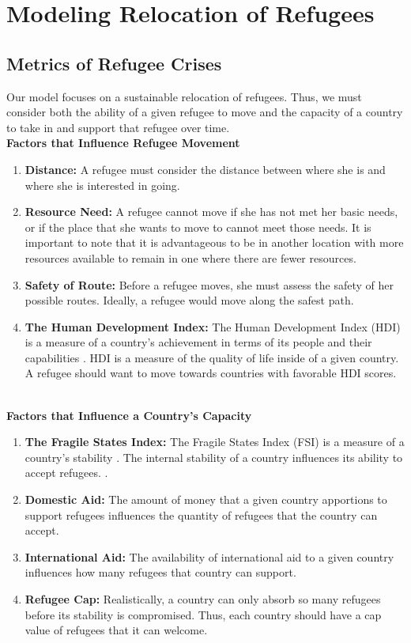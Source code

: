 \documentclass{article}
\begin{document}
\section{Modeling Relocation of Refugees}
\subsection{Metrics of Refugee Crises}
Our model focuses on a sustainable relocation of refugees. Thus, we must consider both the ability of a given refugee to move and the capacity of a country to take in and support that refugee over time. \\

\textbf{Factors that Influence Refugee Movement}
\begin{enumerate}
    \item \textbf{Distance:} A refugee must consider the distance between where she is and where she is interested in going.
    \item \textbf{Resource Need:} A refugee cannot move if she has not met her basic needs, or if the place that she wants to move to cannot meet those needs. It is important to note that it is advantageous to be in another location with more resources available to remain in one where there are fewer resources.
    \item \textbf{Safety of Route:} Before a refugee moves, she must assess the safety of her possible routes. Ideally, a refugee would move along the safest path. 
    \item \textbf{The Human Development Index: } The Human Development Index (HDI) is a measure of a country’s achievement in terms of its people and their capabilities \cite{HDI}. HDI is a measure of the quality of life inside of a given country. A refugee should want to move towards countries with favorable HDI scores. 
\end{enumerate}
\\
\textbf{Factors that Influence a Country's Capacity}
\begin{enumerate}
    \item \textbf{The Fragile States Index:} The Fragile States Index (FSI) is a measure of a country's stability \cite{FSIArt}. The internal stability of a country influences its ability to accept refugees.  .
    \item \textbf{Domestic Aid:} The amount of money that a given country apportions to support refugees influences the quantity of refugees that the country can accept.
    \item \textbf{International Aid:} The availability of international aid to a given country influences how many refugees that country can support.
    \item \textbf{Refugee Cap:} Realistically, a country can only absorb so many refugees before its stability is compromised. Thus, each country should have a cap value of refugees that it can welcome. 
\end{enumerate}
\end{document}
